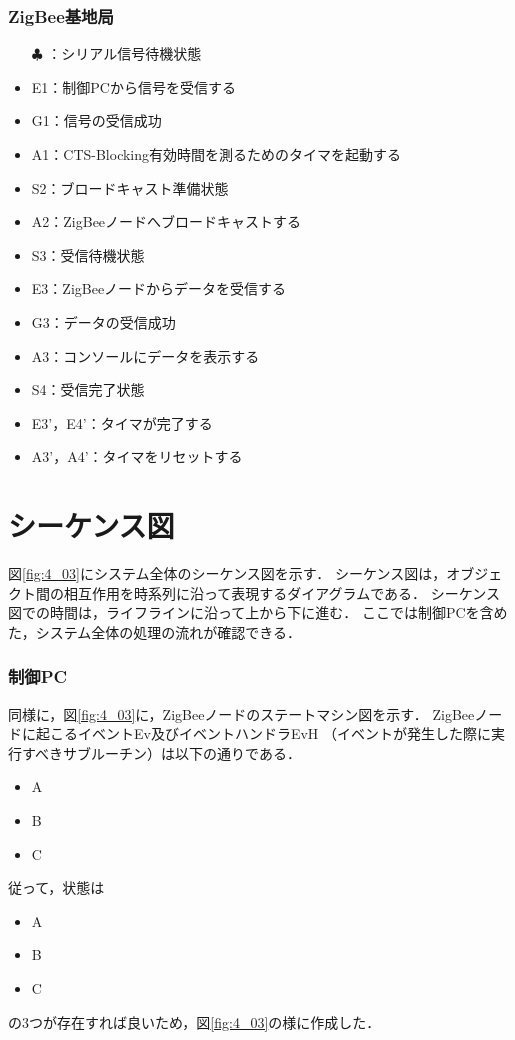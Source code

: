 \documentclass[12pt]{jreport}
\begin{document}
\subsubsection{ZigBee基地局}


\begin{itemize}
 \item[$\clubsuit$]：シリアル信号待機状態
 \item E1：制御PCから信号を受信する
 \item G1：信号の受信成功
 \item A1：CTS-Blocking有効時間を測るためのタイマを起動する
 \item S2：ブロードキャスト準備状態
 \item A2：ZigBeeノードへブロードキャストする
 \item S3：受信待機状態
 \item E3：ZigBeeノードからデータを受信する
 \item G3：データの受信成功
 \item A3：コンソールにデータを表示する
 \item S4：受信完了状態
 \item E3'，E4'：タイマが完了する
 \item A3'，A4'：タイマをリセットする
\end{itemize}

\section{シーケンス図}

図\ref{fig:4_03}にシステム全体のシーケンス図を示す．
シーケンス図は，オブジェクト間の相互作用を時系列に沿って表現するダイアグラムである．
シーケンス図での時間は，ライフラインに沿って上から下に進む．
ここでは制御PCを含めた，システム全体の処理の流れが確認できる．

\subsubsection{制御PC}

同様に，図\ref{fig:4_03}に，ZigBeeノードのステートマシン図を示す．
ZigBeeノードに起こるイベントEv及びイベントハンドラEvH
（イベントが発生した際に実行すべきサブルーチン）は以下の通りである．

\begin{itemize}
 \item A 
 \item B
 \item C
\end{itemize}

従って，状態は

\begin{itemize}
 \item A 
 \item B
 \item C
\end{itemize}

の3つが存在すれば良いため，図\ref{fig:4_03}の様に作成した．
\end{document}
